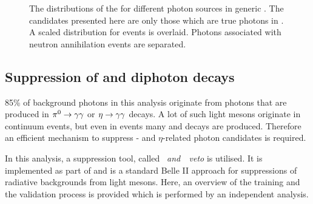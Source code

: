 \begin{figure}[htbp!]
    \centering
    \caption{\label{fig:zmva_distribution_sources} The distributions of the \ZMVA for different photon sources in generic \MC.
    The candidates presented here are only those which are true photons in .
    A scaled \ZMVA distribution for \BtoXsgamma events is overlaid.
    Photons associated with neutron annihilation events are separated.}
\end{figure}

\subsection{Suppression of \texorpdfstring{\piz}{pi0} and \texorpdfstring{\eta}{eta} diphoton decays}\label{sec:selection_vetos}

85\% of background photons in this analysis originate from photons that are produced in $\pi^0\rightarrow\gamma\gamma$ or $\eta\rightarrow\gamma\gamma$ decays.
A lot of such light mesons originate in continuum events, but even in \BB events many \piz and \eta decays are produced.
Therefore an efficient mechanism to suppress \piz- and $\eta$-related photon candidates is required.

In this analysis, a suppression tool, called \textit{\piz~and~\eta~veto} is utilised.
It is implemented as part of \basftwo and is a standard Belle II approach for suppressions of radiative backgrounds from light mesons.
Here, an overview of the training and the validation process is provided which is performed by an independent analysis.

